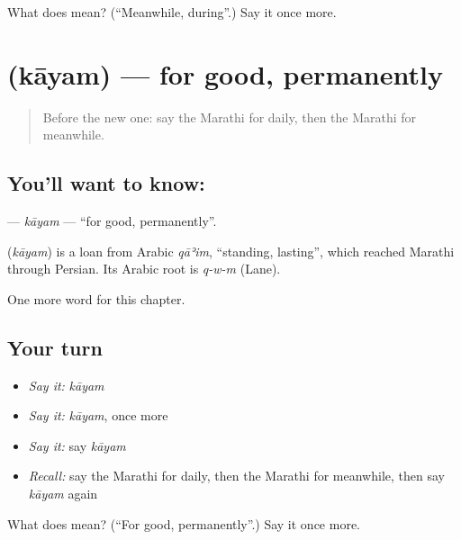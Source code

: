 \begin{tcolorbox}[breakable,colback=teal!4,colframe=teal!35!black,title={Before you move on}]
What does  mean? (\textquotedblleft{}Meanwhile, during\textquotedblright{}.) Say it once more.
\end{tcolorbox}
\section[\texorpdfstring{\mr{कायम} (kāyam)}{कायम (kāyam)}]{ (kāyam) — for good, permanently}

\label{lesson:MR-C230-kayam}



\begin{quote}
Before the new one: say the Marathi for daily, then the Marathi for meanwhile.
\end{quote}

\subsection*{You'll want to know: }
\textbf{} — \emph{kāyam} — \textquotedblleft{}for good, permanently\textquotedblright{}.

\begin{cousinweb}
\textbf{} (\emph{kāyam}) is a loan from Arabic \emph{qāʾim}, \textquotedblleft{}standing, lasting\textquotedblright{}, which reached Marathi through Persian. Its Arabic root is \emph{q-w-m} (Lane).
\end{cousinweb}

\begin{grammarlens}[title={What you've built}]
One more word for this chapter.
\end{grammarlens}

\subsection*{Your turn}
\begin{itemize}
\raggedright
  \item \emph{Say it:} \emph{kāyam}
  \item \emph{Say it:} \emph{kāyam}, once more
  \item \emph{Say it:} say \emph{kāyam}
  \item \emph{Recall:} say the Marathi for daily, then the Marathi for meanwhile, then say \emph{kāyam} again
\end{itemize}

\begin{tcolorbox}[breakable,colback=teal!4,colframe=teal!35!black,title={Before you move on}]
What does  mean? (\textquotedblleft{}For good, permanently\textquotedblright{}.) Say it once more.
\end{tcolorbox}
